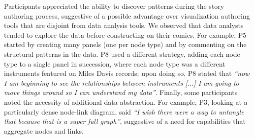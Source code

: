 








\vspace{2mm}
Participants appreciated the ability to discover patterns during the story authoring process, suggestive of a possible advantage over visualization authoring tools that are disjoint from data analysis tools. We observed that data analysts tended to explore the data before constructing on their comics. For example, P5 started by creating many panels (one per node type) and by commenting on the structural patterns in the data. P8 used a different strategy, adding each node type to a single panel in succession, where each node type was a different instruments featured on Miles Davis records; upon doing so, P8 stated that \textit{``now I am beginning to see the relationships between instruments [...] I am going to move things around so I can understand my data''}. Finally, some participants noted the necessity of additional data abstraction. For example, P3, looking at a particularly dense node-link diagram, said \textit{``I wish there were a way to untangle that because that is a super full graph''}, suggestive of a need for capabilities that aggregate nodes and links.
\vspace{-0.2cm}


